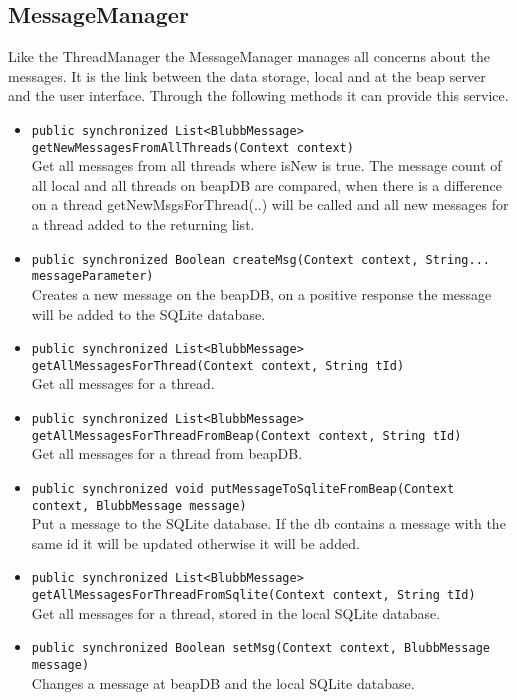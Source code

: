 \documentclass[12pt,a4paper,oneside]{report}
\newcommand{\code}[1]{\lstinline{#1}}
\begin{document}
\subsection{MessageManager}
Like the ThreadManager the MessageManager manages all concerns about the messages. It is the link between the data storage, local and at the beap server and the user interface. Through the following methods it can provide this service.
\begin{itemize}
\item{\code{public synchronized List<BlubbMessage> getNewMessagesFromAllThreads(Context context)}}\\
Get all messages from all threads where isNew is true. The message count of all local and all threads on beapDB are compared, when there is a difference on a thread getNewMsgsForThread(..) will be called and all new messages for a thread added to the returning list.

\item{\code{public synchronized Boolean createMsg(Context context, String... messageParameter)}}\\
 Creates a new message on the beapDB, on a positive response the message will be added to the SQLite database.
     
\item{\code{public synchronized List<BlubbMessage> getAllMessagesForThread(Context context, String tId)}}\\
Get all messages for a thread.

\item{\code{public synchronized List<BlubbMessage> getAllMessagesForThreadFromBeap(Context context, String tId)}}\\
Get all messages for a thread from beapDB.

\item{\code{public synchronized void putMessageToSqliteFromBeap(Context context, BlubbMessage message)}}\\
 Put a message to the SQLite database. If the db contains a message with the same id it will be updated otherwise it will be added.
     
\item{\code{public synchronized List<BlubbMessage> getAllMessagesForThreadFromSqlite(Context context, String tId)}}\\
Get all messages for a thread, stored in the local SQLite database.

\item{\code{public synchronized Boolean setMsg(Context context, BlubbMessage message)}}\\
Changes a message at beapDB and the local SQLite database.
\end{itemize}
\end{document}
